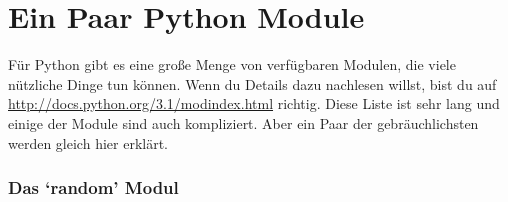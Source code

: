 

\chapter{Ein Paar Python Module}\label{app:afewpythonmodules}

Für Python gibt es eine große Menge von verfügbaren Modulen, die viele nützliche Dinge tun können. Wenn du Details dazu nachlesen willst, bist du auf \href{http://docs.python.org/3.1/modindex.html}{http://docs.python.org/3.1/modindex.html} richtig. Diese Liste ist sehr lang und einige der Module sind auch kompliziert. Aber ein Paar der gebräuchlichsten werden gleich hier erklärt. 

\subsection*{Das `random' Modul}

